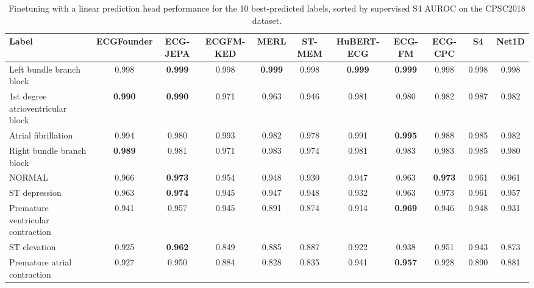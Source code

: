 \documentclass{article}
\begin{document}
                \begin{table}[htbp]
                    \centering
                    \tiny
                    \setlength{\tabcolsep}{2pt}
                    \caption{Finetuning with a linear prediction head performance for the 10 best-predicted labels, sorted by supervised S4 AUROC on the CPSC2018 dataset.}
                    \begin{tabular}{lcccccccccc}
                        \toprule
                        \textbf{Label} & \textbf{ECGFounder} & \textbf{ECG-JEPA} & \textbf{ECGFM-KED} & \textbf{MERL} & \textbf{ST-MEM} & \textbf{HuBERT-ECG} & \textbf{ECG-FM} & \textbf{ECG-CPC} & \textbf{S4} & \textbf{Net1D} \\
                        \midrule
                        Left bundle branch block & 0.998 & \textbf{0.999} & 0.998 & \textbf{0.999} & 0.998 & \textbf{0.999} & \textbf{0.999} & 0.998 & 0.998 & 0.998 \\
                        1st degree atrioventricular block & \textbf{0.990} & \textbf{0.990} & 0.971 & 0.963 & 0.946 & 0.981 & 0.980 & 0.982 & 0.987 & 0.982 \\
                        Atrial fibrillation & 0.994 & 0.980 & 0.993 & 0.982 & 0.978 & 0.991 & \textbf{0.995} & 0.988 & 0.985 & 0.982 \\
                        Right bundle branch block & \textbf{0.989} & 0.981 & 0.971 & 0.983 & 0.974 & 0.981 & 0.983 & 0.983 & 0.985 & 0.980 \\
                        NORMAL & 0.966 & \textbf{0.973} & 0.954 & 0.948 & 0.930 & 0.947 & 0.963 & \textbf{0.973} & 0.961 & 0.961 \\
                        ST depression & 0.963 & \textbf{0.974} & 0.945 & 0.947 & 0.948 & 0.932 & 0.963 & 0.973 & 0.961 & 0.957 \\
                        Premature ventricular contraction & 0.941 & 0.957 & 0.945 & 0.891 & 0.874 & 0.914 & \textbf{0.969} & 0.946 & 0.948 & 0.931 \\
                        ST elevation & 0.925 & \textbf{0.962} & 0.849 & 0.885 & 0.887 & 0.922 & 0.938 & 0.951 & 0.943 & 0.873 \\
                        Premature atrial contraction & 0.927 & 0.950 & 0.884 & 0.828 & 0.835 & 0.941 & \textbf{0.957} & 0.928 & 0.890 & 0.881 \\
                        \bottomrule
                    \end{tabular}
                    \label{tab:results_overview_cpsc}
                \end{table}
\end{document}
